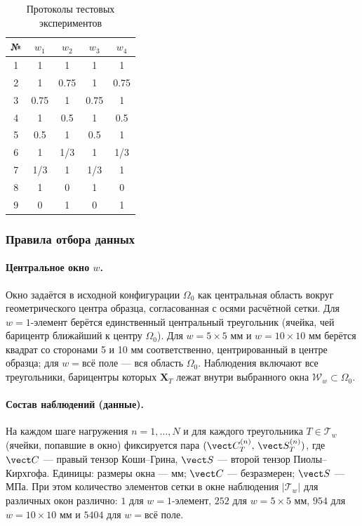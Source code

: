 \begin{table}[H]
\centering
\caption{Протоколы тестовых экспериментов}
\label{tab:test_protocols}
\begin{tabular}{|c|c|c|c|c|}
\hline
\textbf{№} & $w_1$ & $w_2$ & $w_3$ & $w_4$ \\
\hline
1 & 1 & 1 & 1 & 1 \\
2 & 1 & 0.75 & 1 & 0.75 \\
3 & 0.75 & 1 & 0.75 & 1 \\
4 & 1 & 0.5 & 1 & 0.5 \\
5 & 0.5 & 1 & 0.5 & 1 \\
6 & 1 & 1/3 & 1 & 1/3 \\
7 & 1/3 & 1 & 1/3 & 1 \\
8 & 1 & 0 & 1& 0 \\
9 & 0 & 1 & 0 & 1 \\
\hline
\end{tabular}
\end{table}

\subsubsection{Правила отбора данных}
\paragraph{Центральное окно $w$.}
Окно задаётся в исходной конфигурации $\Omega_0$ как центральная область вокруг геометрического центра образца, согласованная с осями расчётной сетки.
Для $w=\text{1-элемент}$ берётся единственный центральный треугольник (ячейка, чей барицентр ближайший к центру $\Omega_0$).
Для $w=5\times5$ мм и $w=10\times10$ мм берётся квадрат со сторонами 5 и 10 мм соответственно, центрированный в центре образца; для $w=\text{всё поле}$ — вся область $\Omega_0$.
Наблюдения включают все треугольники, барицентры которых $\mathbf{X}_T$ лежат внутри выбранного окна $\mathcal{W}_w\subset\Omega_0$.

\paragraph{Состав наблюдений (данные).}
На каждом шаге нагружения $n=1,\dots,N$ и для каждого треугольника $T\in\mathcal{T}_w$ (ячейки, попавшие в окно) фиксируется пара $(\vect C_T^{(n)},\,\vect S_T^{(n)})$, 
где $\vect C$ — правый тензор Коши–Грина, $\vect S$ — второй тензор Пиолы–Кирхгофа.
Единицы: размеры окна — мм; $\vect C$ — безразмерен; $\vect S$ — МПа. 
При этом количество элементов сетки в окне наблюдения $|\mathcal{T}_w|$ для различных окон различно: 
$1$ для $w=\text{1-элемент}$, $252$ для $w=5\times5$ мм, $954$ для $w=10\times10$ мм и $5404$ для $w=\text{всё поле}$.

